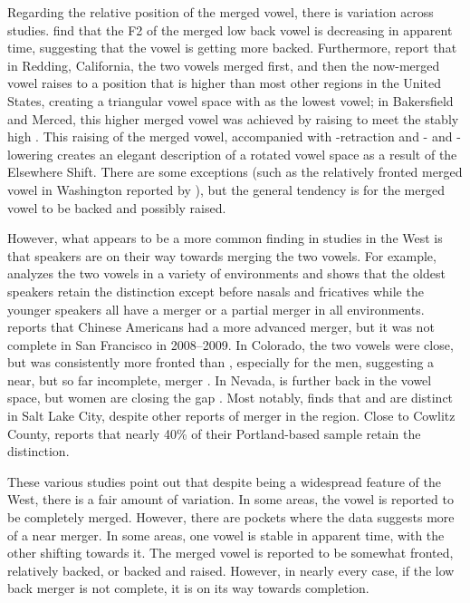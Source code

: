 Regarding the relative position of the merged vowel, there is variation across studies. \citet{holland_brandenburg_2017_pads} find that the F2 of the merged low back vowel is decreasing in apparent time, suggesting that the vowel is getting more backed. Furthermore, \citet[23]{donofrio_etal_2017_pads} report that in Redding, California, the two vowels merged first, and then the now-merged vowel raises to a position that is higher than most other regions in the United States, creating a triangular vowel space with \bat as the lowest vowel; in Bakersfield and Merced, this higher merged vowel was achieved by \lot raising to meet the stably high \thought. This raising of the merged vowel, accompanied with \bat-retraction and \bet- and \bit-lowering creates an elegant description of a rotated vowel space as a result of the Elsewhere Shift. There are some exceptions (such as the relatively fronted merged vowel in Washington reported by \citealt{wassink_2016_pads}), but the general tendency is for the merged vowel to be backed and possibly raised.

However, what appears to be a more common finding in studies in the West is that speakers are on their way towards merging the two vowels. For example, \citet{moonwomon_1991_diss} analyzes the two vowels in a variety of environments and shows that the oldest speakers retain the distinction except before nasals and fricatives while the younger speakers all have a merger or a partial merger in all environments. \citet[367]{hall_lew_2013} reports that Chinese Americans had a more advanced merger, but it was not complete in San Francisco in 2008--2009. In Colorado, the two vowels were close, but \lot was consistently more fronted than \thought, especially for the men, suggesting a near, but so far incomplete, merger \citep{holland_brandenburg_2017_pads}. In Nevada, \thought is further back in the vowel space, but women are closing the gap \citep{fridland_kendall_2017_pads}. Most notably, \citep{dipaolo_1992} finds that \lot and \thought are distinct in Salt Lake City, despite other reports of merger in the region. Close to Cowlitz County, \citet{becker_etal_2016_pads} reports that nearly 40\% of their Portland-based sample retain the distinction.

These various studies point out that despite being a widespread feature of the West, there is a fair amount of variation. In some areas, the vowel is reported to be completely merged. However, there are pockets where the data suggests more of a near merger. In some areas, one vowel is stable in apparent time, with the other shifting towards it. The merged vowel is reported to be somewhat fronted, relatively backed, or backed and raised. However, in nearly every case, if the low back merger is not complete, it is on its way towards completion.

